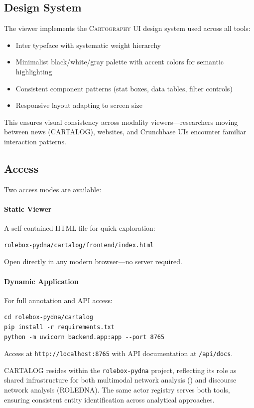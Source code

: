\documentclass[../main.tex]{subfiles}
\begin{document}
\subsection{Design System}

The viewer implements the \textsc{Cartography UI} design system used across all \RoleBox{} tools:

\begin{itemize}[leftmargin=*, itemsep=0.2em]
\item Inter typeface with systematic weight hierarchy
\item Minimalist black/white/gray palette with accent colors for semantic highlighting
\item Consistent component patterns (stat boxes, data tables, filter controls)
\item Responsive layout adapting to screen size
\end{itemize}

This ensures visual consistency across modality viewers---researchers moving between news (CARTALOG), websites, and Crunchbase UIs encounter familiar interaction patterns.

\subsection{Access}

Two access modes are available:

\paragraph{Static Viewer} A self-contained HTML file for quick exploration:
\begin{verbatim}
rolebox-pydna/cartalog/frontend/index.html
\end{verbatim}
Open directly in any modern browser---no server required.

\paragraph{Dynamic Application} For full annotation and API access:
\begin{verbatim}
cd rolebox-pydna/cartalog
pip install -r requirements.txt
python -m uvicorn backend.app:app --port 8765
\end{verbatim}
Access at \texttt{http://localhost:8765} with API documentation at \texttt{/api/docs}.

\begin{insightbox}
\textsc{CARTALOG} resides within the \texttt{rolebox-pydna} project, reflecting its role as shared infrastructure for both multimodal network analysis (\RoleBox{}) and discourse network analysis (ROLEDNA). The same actor registry serves both tools, ensuring consistent entity identification across analytical approaches.
\end{insightbox}
\end{document}
